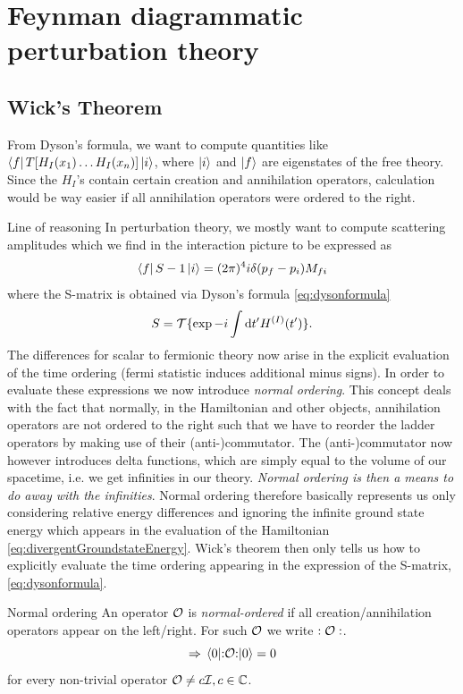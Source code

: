 \section{Feynman diagrammatic perturbation theory}
\subsection{Wick's Theorem}
From Dyson's formula, we want to compute quantities like $\bra{f}T[H_I(x_1)\dots H_I(x_n)] \ket{i}$, where $\ket{i}$ and $\ket{f}$ are eigenstates of the free theory. Since the $H_I$'s contain certain creation and annihilation operators, calculation would be way easier if all annihilation operators were ordered to the right.
\begin{mybox}{Line of reasoning}
	In perturbation theory, we mostly want to compute scattering amplitudes which we find in the interaction picture to be expressed as
	\begin{equation*}
		\bra{f}S-1\ket{i}=(2\pi)^4i \delta(p_f-p_i) M_{fi}
	\end{equation*}
where the S-matrix is obtained via Dyson's formula \ref{eq:dysonformula}
\begin{equation*}
	S=\mathcal{T}\{\exp -i \int \mathrm{d} t^\prime H^{(I)}(t^\prime) \}.
\end{equation*}
The differences for scalar to fermionic theory now arise in the explicit evaluation of the time ordering (fermi statistic induces additional minus signs). In order to evaluate these expressions we now introduce \emph{normal ordering}. This concept deals with the fact that normally, in the Hamiltonian and other objects, annihilation operators are not ordered to the right such that we have to reorder the ladder operators by making use of their (anti-)commutator. The (anti-)commutator now however introduces delta functions, which are simply equal to the volume of our spacetime, i.e. we get infinities in our theory. \emph{Normal ordering is then a means to do away with the infinities}. Normal ordering therefore basically represents us only considering relative energy differences and ignoring the infinite ground state energy which appears in the evaluation of the Hamiltonian \ref{eq:divergentGroundstateEnergy}. Wick's theorem then only tells us how to explicitly evaluate the time ordering appearing in the expression of the S-matrix, \ref{eq:dysonformula}.
\end{mybox}
\begin{mybox}{Normal ordering}
	An operator $\mathcal{O}$ is \emph{normal-ordered} if all creation/annihilation operators appear on the left/right. For such $\mathcal{O}$ we write $:\mathcal{O}:$.
	\begin{equation}
	\label{eq:normordering}
		\Rightarrow \expval{\mathrel{\mathop{:}}\mathrel{\mathcal{O}}\mathrel{\mathop{:}}}{0} = 0
	\end{equation}
	for every non-trivial operator $\mathcal{O}\neq c \mathcal{I}, c\in \mathbb{C}$.
\end{mybox}
